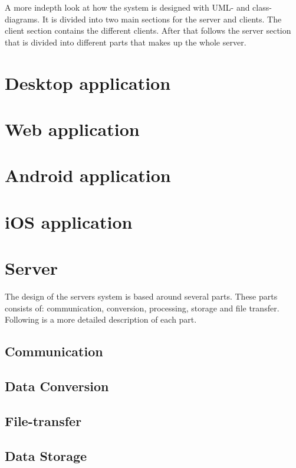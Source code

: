 
A more indepth look at how the system is designed with UML- and class-diagrams. It is divided into two main sections for the server and clients. The client section contains the different clients. After that follows the server section that is divided into different parts that makes up the whole server. 

\section{Desktop application}

\FloatBarrier

\section{Web application}


\FloatBarrier

\section{Android application}

\FloatBarrier

\section{iOS application}

\FloatBarrier

\section{Server}
The design of the servers system is based around several parts. These parts consists of: communication, conversion, processing, storage and file transfer. Following is a more detailed description of each part.

\subsection{Communication}

\FloatBarrier
\subsection{Data Conversion}

\FloatBarrier
\subsection{File-transfer}

\FloatBarrier
\subsection{Data Storage}

\FloatBarrier
